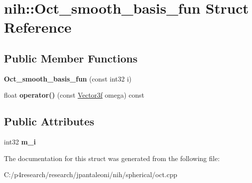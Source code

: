 \hypertarget{structnih_1_1_oct__smooth__basis__fun}{
\section{nih\-:\-:\-Oct\-\_\-smooth\-\_\-basis\-\_\-fun \-Struct \-Reference}
\label{structnih_1_1_oct__smooth__basis__fun}
}
\subsection*{\-Public \-Member \-Functions}
\begin{DoxyCompactItemize}
\item 
\hypertarget{structnih_1_1_oct__smooth__basis__fun_a11f44dfa684e14d5e4fd7ff0152022ef}{
{\bfseries \-Oct\-\_\-smooth\-\_\-basis\-\_\-fun} (const int32 i)}
\label{structnih_1_1_oct__smooth__basis__fun_a11f44dfa684e14d5e4fd7ff0152022ef}

\item 
\hypertarget{structnih_1_1_oct__smooth__basis__fun_a05895827256b12838ef2fd421ff1f6ef}{
float {\bfseries operator()} (const \hyperlink{structnih_1_1_vector}{\-Vector3f} omega) const }
\label{structnih_1_1_oct__smooth__basis__fun_a05895827256b12838ef2fd421ff1f6ef}

\end{DoxyCompactItemize}
\subsection*{\-Public \-Attributes}
\begin{DoxyCompactItemize}
\item 
\hypertarget{structnih_1_1_oct__smooth__basis__fun_abb813fbd50f1d1a506906177f313dd71}{
int32 {\bfseries m\-\_\-i}}
\label{structnih_1_1_oct__smooth__basis__fun_abb813fbd50f1d1a506906177f313dd71}

\end{DoxyCompactItemize}


\-The documentation for this struct was generated from the following file\-:\begin{DoxyCompactItemize}
\item 
\-C\-:/p4research/research/jpantaleoni/nih/spherical/oct.\-cpp\end{DoxyCompactItemize}
